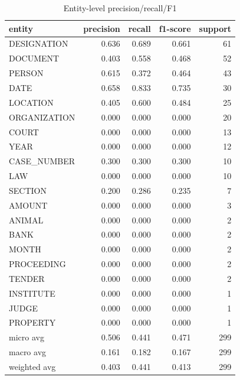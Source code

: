 \begin{table}
\caption{Entity-level precision/recall/F1}
\label{tab:ner_results}
\begin{tabular}{lrrrr}
\toprule
entity & precision & recall & f1-score & support \\
\midrule
DESIGNATION & 0.636 & 0.689 & 0.661 & 61 \\
DOCUMENT & 0.403 & 0.558 & 0.468 & 52 \\
PERSON & 0.615 & 0.372 & 0.464 & 43 \\
DATE & 0.658 & 0.833 & 0.735 & 30 \\
LOCATION & 0.405 & 0.600 & 0.484 & 25 \\
ORGANIZATION & 0.000 & 0.000 & 0.000 & 20 \\
COURT & 0.000 & 0.000 & 0.000 & 13 \\
YEAR & 0.000 & 0.000 & 0.000 & 12 \\
CASE\_NUMBER & 0.300 & 0.300 & 0.300 & 10 \\
LAW & 0.000 & 0.000 & 0.000 & 10 \\
SECTION & 0.200 & 0.286 & 0.235 & 7 \\
AMOUNT & 0.000 & 0.000 & 0.000 & 3 \\
ANIMAL & 0.000 & 0.000 & 0.000 & 2 \\
BANK & 0.000 & 0.000 & 0.000 & 2 \\
MONTH & 0.000 & 0.000 & 0.000 & 2 \\
PROCEEDING & 0.000 & 0.000 & 0.000 & 2 \\
TENDER & 0.000 & 0.000 & 0.000 & 2 \\
INSTITUTE & 0.000 & 0.000 & 0.000 & 1 \\
JUDGE & 0.000 & 0.000 & 0.000 & 1 \\
PROPERTY & 0.000 & 0.000 & 0.000 & 1 \\
micro avg & 0.506 & 0.441 & 0.471 & 299 \\
macro avg & 0.161 & 0.182 & 0.167 & 299 \\
weighted avg & 0.403 & 0.441 & 0.413 & 299 \\
\bottomrule
\end{tabular}
\end{table}
